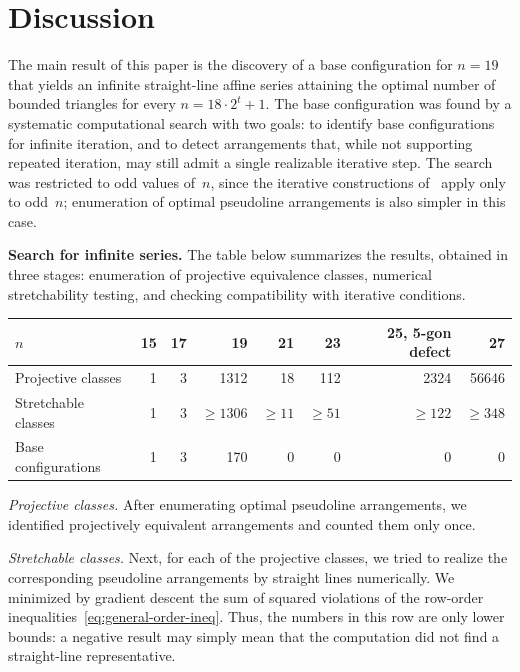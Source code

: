 \section{Discussion}\label{sec:discussion}

The main result of this paper is the discovery of a base configuration for
$n=19$ that yields an infinite straight-line affine series attaining the optimal
number of bounded triangles for every $n=18\cdot 2^t+1$.
The base configuration was found by a systematic computational search with
two goals: to identify base configurations for infinite iteration, and to
detect arrangements that, while not supporting repeated iteration, may still
admit a single realizable iterative step.
The search was restricted to odd values of~$n$, since the iterative
constructions of~\cite{forge1998,bartholdi2007} apply only to odd~$n$;
enumeration of optimal pseudoline arrangements is also simpler in this case.

\textbf{Search for infinite series.}
The table below summarizes the results,
obtained in three stages:
enumeration of projective equivalence classes,
numerical stretchability testing, and
checking compatibility with iterative conditions.

\medskip
\noindent\begin{tabular}{|l|r|r|r|r|r|r|r|}
 \hline
 $n$                  & 15 & 17 & 19         & 21       & 23  & 25, 5-gon defect & 27 \\
 \hline
 Projective classes   & 1  & 3  & 1312       & 18       & 112 & 2324             & 56646 \\
 \hline
 Stretchable classes  & 1  & 3  & $\geq1306$ & $\geq11$ & $\geq51$ & $\geq122$   & $\geq348$   \\
 \hline
 Base configurations  & 1  & 3  & 170        & 0        & 0   & 0                & 0 \\
 \hline
\end{tabular}
\medskip

\emph{Projective classes.}
After enumerating optimal pseudoline arrangements, we identified projectively
equivalent arrangements and counted them only once.

\emph{Stretchable classes.}
Next, for each of the projective classes, we tried to realize the
corresponding pseudoline arrangements by straight lines numerically. We
minimized by gradient descent the sum of squared violations of the row-order
inequalities~\eqref{eq:general-order-ineq}. Thus, the numbers in this row are
only lower bounds: a
negative result may simply mean that the computation did not find a straight-line representative.

